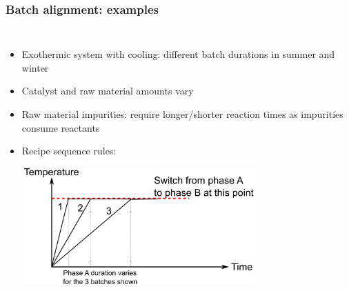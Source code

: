 \documentclass[handout, 12pt]{beamer}
\begin{document}
\begin{frame}\frametitle{Batch alignment: examples}

\begin{columns}
	
	
		\small
		\begin{itemize}
			\item	Exothermic system with cooling: different batch durations in summer and winter

			\item	Catalyst and raw material amounts vary 

			\item	Raw material impurities: require longer/shorter reaction times as impurities consume reactants
			
			\item	Recipe sequence rules:

					\begin{center}
						\includegraphics[width=0.7\textwidth]{images/alignment-due-to-phase-switching.png}
					\end{center}
		\end{itemize}
		\vspace{12pt}
		
	

\end{columns}
\end{frame}
\end{document}
